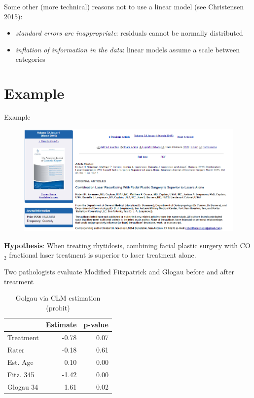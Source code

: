 \documentclass{beamer}
\begin{document}
\begin{frame}
Some other (more technical) reasons not to use a linear model (see Christensen 2015):

\begin{itemize}
\item \emph{standard errors are inappropriate}: residuals cannot be normally distributed
\item \emph{inflation of information in the data}: linear models assume a scale between categories
\end{itemize}
\end{frame}

\section{Example}
\begin{frame}{Example}
\begin{figure}
\centering
\includegraphics[width=1.1\textwidth]{Sorensen2015}
\label{fig:sorensen_2015}
\end{figure}
\end{frame}

\begin{frame}
\textbf{Hypothesis}: When treating rhytidosis, combining facial plastic surgery with CO$_2$ fractional laser treatment is superior to laser treatment alone.

\vspace{25pt}

Two pathologists evaluate Modified Fitzpatrick and Glogau before and after treatment
\end{frame}

\begin{frame}
  \begin{table}[]
  \centering
  \caption{Golgau via CLM estimation (probit)}
  \label{my-label}
  \begin{tabular}{lrr} \hline
            & Estimate & p-value \\ \hline \hline
  Treatment & -0.78    & 0.07    \\
  Rater     & -0.18    & 0.61    \\
  Est. Age  &  0.10    & 0.00    \\
  Fitz. 345 & -1.42    & 0.00    \\
  Glogau 34 &  1.61    & 0.02    \\ \hline
  \end{tabular}
  \end{table}
\end{frame}
\end{document}
